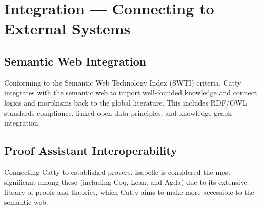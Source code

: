 
\chapter*{Integration --- Connecting to External Systems}

\section*{Semantic Web Integration}
Conforming to the Semantic Web Technology Index (SWTI) criteria, Catty integrates with the semantic web to import well-founded knowledge and connect logics and morphisms back to the global literature. This includes RDF/OWL standards compliance, linked open data principles, and knowledge graph integration.

\section*{Proof Assistant Interoperability}
Connecting Catty to established provers. Isabelle is considered the most significant among these (including Coq, Lean, and Agda) due to its extensive library of proofs and theories, which Catty aims to make more accessible to the semantic web.
